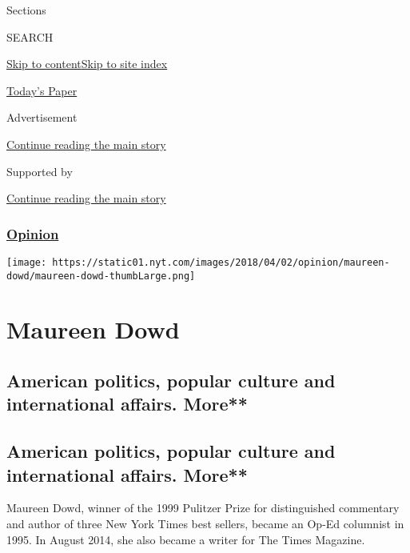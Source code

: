 Sections

SEARCH

\protect\hyperlink{site-content}{Skip to
content}\protect\hyperlink{site-index}{Skip to site index}

\href{https://myaccount.nytimes.com/auth/login?response_type=cookie\&client_id=vi}{}

\href{https://www.nytimes.com/section/todayspaper}{Today's Paper}

Advertisement

\protect\hyperlink{after-top}{Continue reading the main story}

Supported by

\protect\hyperlink{after-sponsor}{Continue reading the main story}

\hypertarget{opinion}{%
\subsubsection{\texorpdfstring{\href{/section/opinion}{Opinion}}{Opinion}}\label{opinion}}

\texttt{[image: https://static01.nyt.com/images/2018/04/02/opinion/maureen-dowd/maureen-dowd-thumbLarge.png]}

\hypertarget{maureen-dowd}{%
\section{Maureen Dowd}\label{maureen-dowd}}

\hypertarget{american-politics-popular-culture-and-international-affairs-more}{%
\subsection{American politics, popular culture and international
affairs.
More**}\label{american-politics-popular-culture-and-international-affairs-more}}

\hypertarget{american-politics-popular-culture-and-international-affairs-more-1}{%
\subsection{American politics, popular culture and international
affairs.
More**}\label{american-politics-popular-culture-and-international-affairs-more-1}}

Maureen Dowd, winner of the 1999 Pulitzer Prize for distinguished
commentary and author of three New York Times best sellers, became an
Op-Ed columnist in 1995. In August 2014, she also became a writer for
The Times Magazine.

